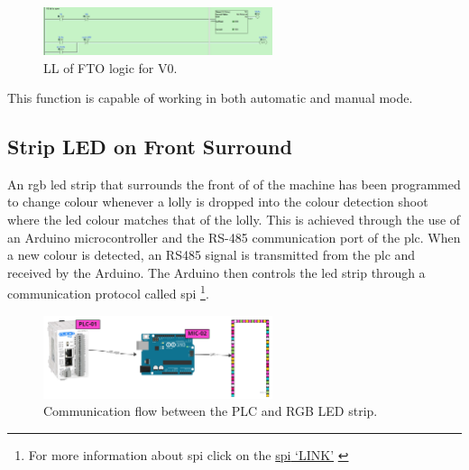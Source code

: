         \begin{figure}[H]
            \centering
            \includegraphics[width = 0.6\textwidth]{2_images/ftoLl}
            \caption{LL of FTO logic for V0.}
            \label{fig:ftoLl}
        \end{figure}          
        This function is capable of working in both automatic and manual mode.   
        
    \subsection{Strip LED on Front Surround} \label{sec:stripLed}
        An \acrshort{rgb} \acrshort{led} strip that surrounds the front of of the machine has been programmed to change colour whenever a lolly is dropped into the colour detection shoot where the \acrshort{led} colour matches that of the lolly. This is achieved through the use of an Arduino microcontroller and the RS-485 communication port of the \acrshort{plc}. When a new colour is detected, an RS485 signal is transmitted from the \acrshort{plc} and received by the Arduino. The Arduino then controls the \acrshort{led} strip through a communication protocol called \acrshort{spi} \footnote{For more information about \acrshort{spi} click on the \href{https://learn.sparkfun.com/tutorials/serial-peripheral-interface-spi/all}{\acrshort{spi} `LINK'} \cite{spi}}.

        \begin{figure}[H]
            \centering
            \includegraphics[width = 0.6\textwidth]{2_images/rgbStrip}
            \caption{Communication flow between the PLC and RGB LED strip.}
            \label{fig:rgbStrip}
        \end{figure} 

        
        
        

        
        
    